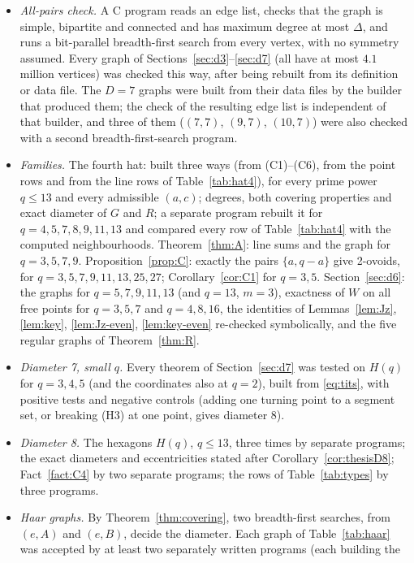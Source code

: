 \documentclass[11pt]{amsart}
\theoremstyle{definition}
\theoremstyle{remark}
\numberwithin{equation}{section}
\begin{document}
\begin{itemize}
\item \emph{All-pairs check.} A C program reads an edge list, checks that the graph is simple, bipartite and connected and has
  maximum degree at most $\Delta$, and runs a bit-parallel breadth-first search from every vertex, with no symmetry assumed.
  Every graph of Sections~\ref{sec:d3}--\ref{sec:d7} (all have at most $4.1$ million vertices) was
  checked this way, after being rebuilt from its definition or data file. The $D=7$ graphs were built from their data files by
  the builder that produced them; the check of the resulting edge list is independent of that builder, and three of them
  ($(7,7)$, $(9,7)$, $(10,7)$) were also checked with a second breadth-first-search program.
\item \emph{Families.} The fourth hat: built three ways (from (C1)--(C6), from the point rows and from the line rows of
  Table~\ref{tab:hat4}), for every prime power $q\le13$ and every admissible $(a,c)$; degrees, both covering properties and exact
  diameter of $G$ and $R$; a separate program rebuilt it for $q=4,5,7,8,9,11,13$ and compared every row of
Table~\ref{tab:hat4} with the computed neighbourhoods.
  Theorem~\ref{thm:A}: line sums and the graph for $q=3,5,7,9$. Proposition~\ref{prop:C}: exactly the pairs $\{a,q-a\}$ give
  2-ovoids, for $q=3,5,7,9,11,13,25,27$; Corollary~\ref{cor:C1} for $q=3,5$. Section~\ref{sec:d6}: the graphs for
  $q=5,7,9,11,13$ (and $q=13$, $m=3$), exactness of $W$ on all free points for $q=3,5,7$ and $q=4,8,16$, the identities of
  Lemmas~\ref{lem:Jz}, \ref{lem:key}, \ref{lem:Jz-even}, \ref{lem:key-even} re-checked symbolically, and the five regular graphs
  of Theorem~\ref{thm:R}.
\item \emph{Diameter 7, small $q$.} Every theorem of Section~\ref{sec:d7} was tested on $H(q)$ for $q=3,4,5$ (and the coordinates also at $q=2$), built from
  \eqref{eq:tits}, with positive tests and negative controls (adding one turning point to a segment set, or breaking (H3) at
  one point, gives diameter 8).
\item \emph{Diameter 8.} The hexagons $H(q)$, $q\le13$, three times by separate programs; the exact diameters and
  eccentricities stated after Corollary~\ref{cor:thesisD8}; Fact~\ref{fact:C4} by two separate programs; the rows of
  Table~\ref{tab:types} by three programs.
\item \emph{Haar graphs.} By Theorem~\ref{thm:covering}, two breadth-first searches, from $(e,A)$ and $(e,B)$, decide the
  diameter. Each graph of Table~\ref{tab:haar} was accepted by at least two separately written programs (each building the

\end{itemize}
\end{document}
